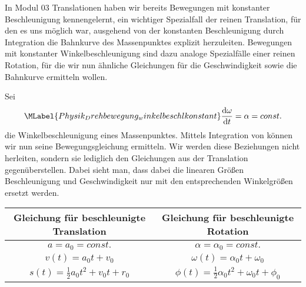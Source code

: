   
  \begin{MIntro}
  In Modul 03 Translationen haben wir bereits Bewegungen mit konstanter Beschleunigung kennengelernt, ein wichtiger Spezialfall der reinen Translation, f\"ur den es uns m\"oglich war, ausgehend von der konstanten Beschleunigung durch Integration die Bahnkurve des Massenpunktes explizit herzuleiten. Bewegungen mit konstanter Winkelbeschleunigung sind dazu analoge Spezialf\"alle einer reinen Rotation, f\"ur die wir nun \"ahnliche Gleichungen f\"ur die Geschwindigkeit sowie die Bahnkurve ermitteln wollen.  
\end{MIntro}


\begin{MContent}
\begin{MInfo} Sei 
\begin{equation}\MLabel{Physik_Drehbewegung_winkelbeschlkonstant}
\frac{\textrm{d}\omega}{\textrm{d}t}=\alpha=const.
\end{equation} die Winkelbeschleunigung eines Massenpunktes. Mittels Integration von  k\"onnen wir nun seine Bewegungsgleichung ermitteln. Wir werden diese Beziehungen nicht herleiten, sondern sie lediglich den Gleichungen aus der Translation gegen\"uberstellen. Dabei sieht man, dass dabei die linearen Gr\"o{\ss}en Beschleunigung und Geschwindigkeit nur mit den entsprechenden Winkelgr\"o{\ss}en ersetzt werden.
  \begin{center}
    \begin{tabular}{|c|c|} \hline
     
       Gleichung f\"ur beschleunigte Translation & Gleichung f\"ur beschleunigte Rotation\\ \hline
       $a=a_0=const.$ & $\alpha=\alpha_0=const.$ \\
       $v(t)=a_0t+v_0$ & $\omega(t)=\alpha_0t+\omega_0$ \\
       $s(t)=\frac{1}{2}a_0t^2+v_0t+r_0$ & $\phi(t)=\frac{1}{2}\alpha_0t^2+\omega_0t+\phi_0$ \\
       \hline
    \end{tabular}
    \end{center}
    \end{MInfo}
    \end{MContent}
    
